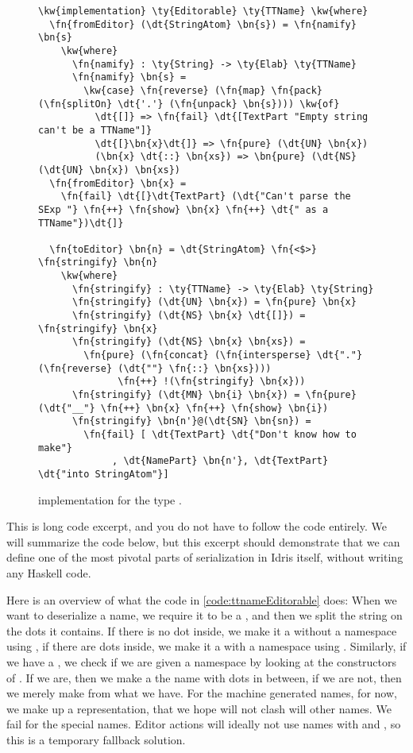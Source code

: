 \begin{figure}[ht]
\caption{ implementation for the type .}
\label{code:ttnameEditorable}
\begin{Verbatim}[framesep=2mm, label=\footnotesize{\normalfont{Idris}}, labelposition=topline]
\kw{implementation} \ty{Editorable} \ty{TTName} \kw{where}
  \fn{fromEditor} (\dt{StringAtom} \bn{s}) = \fn{namify} \bn{s}
    \kw{where}
      \fn{namify} : \ty{String} -> \ty{Elab} \ty{TTName}
      \fn{namify} \bn{s} =
        \kw{case} \fn{reverse} (\fn{map} \fn{pack} (\fn{splitOn} \dt{'.'} (\fn{unpack} \bn{s}))) \kw{of}
          \dt{[]} => \fn{fail} \dt{[TextPart "Empty string can't be a TTName"]}
          \dt{[}\bn{x}\dt{]} => \fn{pure} (\dt{UN} \bn{x})
          (\bn{x} \dt{::} \bn{xs}) => \bn{pure} (\dt{NS} (\dt{UN} \bn{x}) \bn{xs})
  \fn{fromEditor} \bn{x} =
    \fn{fail} \dt{[}\dt{TextPart} (\dt{"Can't parse the SExp "} \fn{++} \fn{show} \bn{x} \fn{++} \dt{" as a TTName"})\dt{]}

  \fn{toEditor} \bn{n} = \dt{StringAtom} \fn{<$>} \fn{stringify} \bn{n}
    \kw{where}
      \fn{stringify} : \ty{TTName} -> \ty{Elab} \ty{String}
      \fn{stringify} (\dt{UN} \bn{x}) = \fn{pure} \bn{x}
      \fn{stringify} (\dt{NS} \bn{x} \dt{[]}) = \fn{stringify} \bn{x}
      \fn{stringify} (\dt{NS} \bn{x} \bn{xs}) =
        \fn{pure} (\fn{concat} (\fn{intersperse} \dt{"."} (\fn{reverse} (\dt{""} \fn{::} \bn{xs})))
              \fn{++} !(\fn{stringify} \bn{x}))
      \fn{stringify} (\dt{MN} \bn{i} \bn{x}) = \fn{pure} (\dt{"__"} \fn{++} \bn{x} \fn{++} \fn{show} \bn{i})
      \fn{stringify} \bn{n'}@(\dt{SN} \bn{sn}) =
        \fn{fail} [ \dt{TextPart} \dt{"Don't know how to make"}
             , \dt{NamePart} \bn{n'}, \dt{TextPart} \dt{"into StringAtom"}]
\end{Verbatim}
\end{figure}

This is long code excerpt, and you do not have to follow the code entirely.
We will summarize the code below, but this excerpt should demonstrate that
we can define one of the most pivotal parts of serialization in Idris itself,
without writing any Haskell code.

Here is an overview of what the code in \autoref{code:ttnameEditorable} does:
When we want to deserialize a name, we require it to be a , and
then we split the string  on the dots it contains. If there is no dot
inside, we make it a  without a namespace using , if there
are dots inside, we make it a  with a namespace using .
Similarly, if we have a , we check if we are given a namespace by
looking at the constructors of . If we are, then we make a
 the name with dots in between, if we are not, then we merely make
 from what we have.
For the machine generated names, for now, we make up a representation, that we
hope will not clash will other names.
We fail for the special names. Editor actions will ideally not use names with
 and , so this is a temporary fallback solution.

